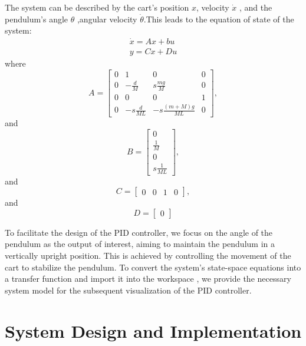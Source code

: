 \documentclass[journal,twoside,web]{ieeecolor}
\begin{document}
The system can be described by the cart's position \(x\), velocity \(\dot{x}\) , and the pendulum's angle \(\theta\) ,angular velocity \(\dot{\theta}\).This leads to the equation of state of the system:
\begin{equation}\begin{array}{l}{\dot{x}=Ax+bu}\\{y=Cx+Du}\end{array}\label{eq9}\end{equation}
where
\begin{equation}\label{eq10}A=\begin{bmatrix}0&1&0&0\\0&-\frac{d} M&s\frac{mg}M&0\\0&0&0&1\\0&-s\frac{d}{ML}&-s\frac{(m+M)g}{ML}&0\end{bmatrix},\end{equation}
and
\begin{equation}\label{eq11}B=\begin{bmatrix}0\\\frac{1}{M}\\0\\s\frac{1}{ML}\end{bmatrix},\end{equation}
and
\begin{equation}\label{eq12}C=\begin{bmatrix}0&0&1&0\end{bmatrix},\end{equation}
and
\begin{equation}\label{eq13}D=\begin{bmatrix}0\end{bmatrix}\end{equation}

To facilitate the design of the PID controller, we focus on the angle of the pendulum as the output of interest, aiming to maintain the pendulum in a vertically upright position. This is achieved by controlling the movement of the cart to stabilize the pendulum.
To convert the system's state-space equations into a transfer function and import it into the workspace , we provide the necessary system model for the subsequent visualization of the PID controller.

\section{System Design and Implementation}
\end{document}
